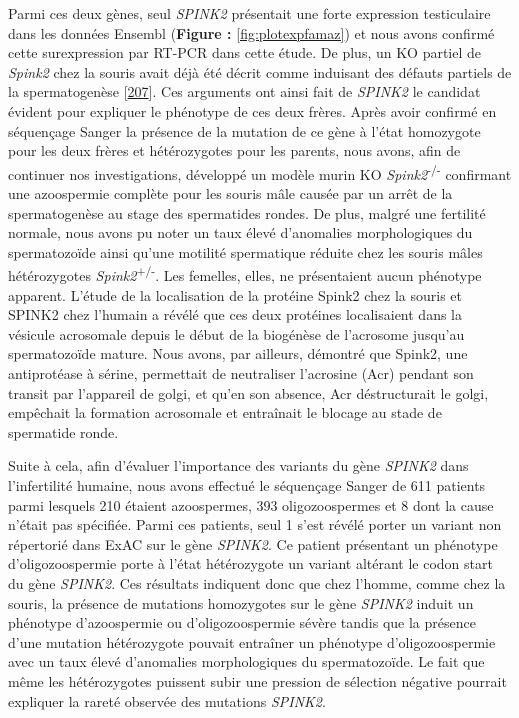 \documentclass[12pt,a4paper,twoside]{ugathesis}
\theoremstyle{definition}
\theoremstyle{definition}
\theoremstyle{definition}
\theoremstyle{remark}
\begin{document}
Parmi ces deux gènes, seul \emph{SPINK2} présentait une forte expression
testiculaire dans les données Ensembl (\textbf{Figure :
}\ref{fig:plotexpfamaz}) et nous avons confirmé cette surexpression par
RT-PCR dans cette étude. De plus, un KO partiel de \emph{Spink2} chez la
souris avait déjà été décrit comme induisant des défauts partiels de la
spermatogenèse {[}\protect\hyperlink{ref-Lee2011}{207}{]}. Ces arguments
ont ainsi fait de \emph{SPINK2} le candidat évident pour expliquer le
phénotype de ces deux frères. Après avoir confirmé en séquençage Sanger
la présence de la mutation de ce gène à l'état homozygote pour les deux
frères et hétérozygotes pour les parents, nous avons, afin de continuer
nos investigations, développé un modèle murin KO
\emph{Spink2}\textsuperscript{-/-} confirmant une azoospermie complète
pour les souris mâle causée par un arrêt de la spermatogenèse au stage
des spermatides rondes. De plus, malgré une fertilité normale, nous
avons pu noter un taux élevé d'anomalies morphologiques du spermatozoïde
ainsi qu'une motilité spermatique réduite chez les souris mâles
hétérozygotes \emph{Spink2}\textsuperscript{+/-}. Les femelles, elles,
ne présentaient aucun phénotype apparent. L'étude de la localisation de
la protéine Spink2 chez la souris et SPINK2 chez l'humain a révélé que
ces deux protéines localisaient dans la vésicule acrosomale depuis le
début de la biogénèse de l'acrosome jusqu'au spermatozoïde mature. Nous
avons, par ailleurs, démontré que Spink2, une antiprotéase à sérine,
permettait de neutraliser l'acrosine (Acr) pendant son transit par
l'appareil de golgi, et qu'en son absence, Acr déstructurait le golgi,
empêchait la formation acrosomale et entraînait le blocage au stade de
spermatide ronde.

Suite à cela, afin d'évaluer l'importance des variants du gène
\emph{SPINK2} dans l'infertilité humaine, nous avons effectué le
séquençage Sanger de 611 patients parmi lesquels 210 étaient
azoospermes, 393 oligozoospermes et 8 dont la cause n'était pas
spécifiée. Parmi ces patients, seul 1 s'est révélé porter un variant non
répertorié dans ExAC sur le gène \emph{SPINK2}. Ce patient présentant un
phénotype d'oligozoospermie porte à l'état hétérozygote un variant
altérant le codon start du gène \emph{SPINK2}. Ces résultats indiquent
donc que chez l'homme, comme chez la souris, la présence de mutations
homozygotes sur le gène \emph{SPINK2} induit un phénotype d'azoospermie
ou d'oligozoospermie sévère tandis que la présence d'une mutation
hétérozygote pouvait entraîner un phénotype d'oligozoospermie avec un
taux élevé d'anomalies morphologiques du spermatozoïde. Le fait que même
les hétérozygotes puissent subir une pression de sélection négative
pourrait expliquer la rareté observée des mutations \emph{SPINK2}.
\end{document}
